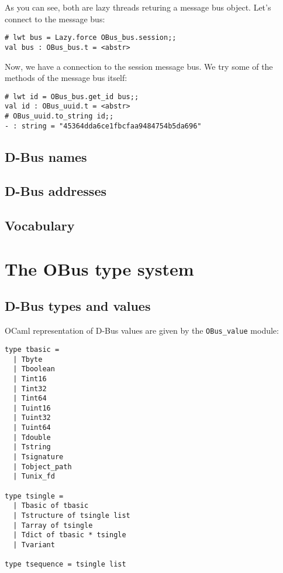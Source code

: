\documentclass{article}
\begin{document}
As you can see, both are lazy threads returing a message bus
object. Let's connect to the message bus:

\begin{verbatim}
# lwt bus = Lazy.force OBus_bus.session;;
val bus : OBus_bus.t = <abstr>
\end{verbatim}

Now, we have a connection to the session message bus. We try some of
the methods of the message bus itself:

\begin{verbatim}
# lwt id = OBus_bus.get_id bus;;
val id : OBus_uuid.t = <abstr>
# OBus_uuid.to_string id;;
- : string = "45364dda6ce1fbcfaa9484754b5da696"
\end{verbatim}

\subsection{D-Bus names}

\subsection{D-Bus addresses}

\subsection{Vocabulary}


\section{The OBus type system}

\subsection{D-Bus types and values}



OCaml representation of D-Bus values are given by the
\texttt{OBus\_value} module:

\begin{verbatim}
type tbasic =
  | Tbyte
  | Tboolean
  | Tint16
  | Tint32
  | Tint64
  | Tuint16
  | Tuint32
  | Tuint64
  | Tdouble
  | Tstring
  | Tsignature
  | Tobject_path
  | Tunix_fd

type tsingle =
  | Tbasic of tbasic
  | Tstructure of tsingle list
  | Tarray of tsingle
  | Tdict of tbasic * tsingle
  | Tvariant

type tsequence = tsingle list
\end{verbatim}
\end{document}
